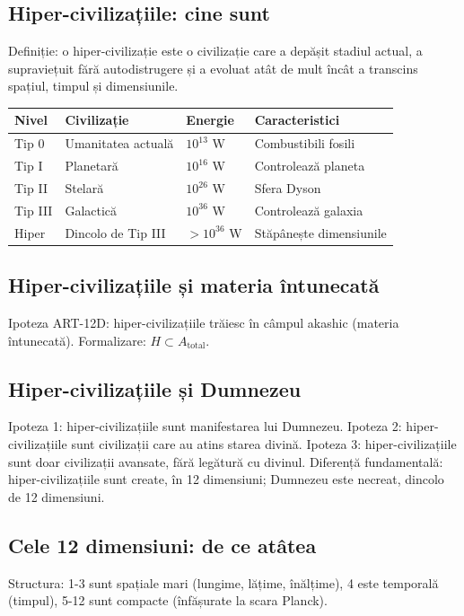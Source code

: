 \documentclass[11pt,a4paper]{article}
\begin{document}
\subsection{Hiper-civilizațiile: cine sunt}
Definiție: o hiper-civilizație este o civilizație care a depășit stadiul actual, a supraviețuit fără autodistrugere și a evoluat atât de mult încât a transcins spațiul, timpul și dimensiunile.
\begin{table}[H]
\centering
\begin{tabular}{@{}llll@{}}
\toprule
\textbf{Nivel} & \textbf{Civilizație} & \textbf{Energie} & \textbf{Caracteristici} \\ \midrule
Tip 0 & Umanitatea actuală & $10^{13}$ W & Combustibili fosili \\
Tip I & Planetară & $10^{16}$ W & Controlează planeta \\
Tip II & Stelară & $10^{26}$ W & Sfera Dyson \\
Tip III & Galactică & $10^{36}$ W & Controlează galaxia \\
Hiper & Dincolo de Tip III & $>10^{36}$ W & Stăpânește dimensiunile \\ \bottomrule
\end{tabular}
\end{table}

\subsection{Hiper-civilizațiile și materia întunecată}
Ipoteza ART-12D: hiper-civilizațiile trăiesc în câmpul akashic (materia întunecată). Formalizare: $H \subset A_{\text{total}}$.

\subsection{Hiper-civilizațiile și Dumnezeu}
Ipoteza 1: hiper-civilizațiile sunt manifestarea lui Dumnezeu. Ipoteza 2: hiper-civilizațiile sunt civilizații care au atins starea divină. Ipoteza 3: hiper-civilizațiile sunt doar civilizații avansate, fără legătură cu divinul. Diferență fundamentală: hiper-civilizațiile sunt create, în 12 dimensiuni; Dumnezeu este necreat, dincolo de 12 dimensiuni.

\subsection{Cele 12 dimensiuni: de ce atâtea}
Structura: 1-3 sunt spațiale mari (lungime, lățime, înălțime), 4 este temporală (timpul), 5-12 sunt compacte (înfășurate la scara Planck).
\end{document}
